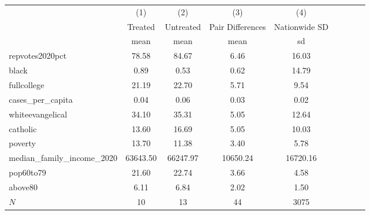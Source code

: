 {
\def\sym#1{\ifmmode^{#1}\else\(^{#1}\)\fi}
\begin{tabular}{l*{4}{cc}}
\hline\hline
            &\multicolumn{1}{c}{(1)}&\multicolumn{1}{c}{(2)}&\multicolumn{1}{c}{(3)}&\multicolumn{1}{c}{(4)}\\
            &     Treated&   Untreated&Pair Differences&Nationwide SD\\
            &        mean&        mean&        mean&          sd\\
\hline
repvotes2020pct&       78.58&       84.67&        6.46&       16.03\\
black       &        0.89&        0.53&        0.62&       14.79\\
fullcollege &       21.19&       22.70&        5.71&        9.54\\
cases\_per\_capita&        0.04&        0.06&        0.03&        0.02\\
whiteevangelical&       34.10&       35.31&        5.05&       12.64\\
catholic    &       13.60&       16.69&        5.05&       10.03\\
poverty     &       13.70&       11.38&        3.40&        5.78\\
median\_family\_income\_2020&    63643.50&    66247.97&    10650.24&    16720.16\\
pop60to79   &       21.60&       22.74&        3.66&        4.58\\
above80     &        6.11&        6.84&        2.02&        1.50\\
\hline
\(N\)       &          10&          13&          44&        3075\\
\hline\hline
\end{tabular}
}
